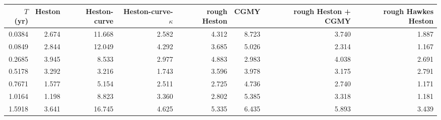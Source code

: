 \begin{tabular}{rrrrrrrr}
\toprule
$T$ (yr) & Heston & Heston-curve & Heston-curve-$\kappa$ & rough Heston & CGMY & rough Heston + CGMY & rough Hawkes Heston\\
\midrule
0.0384 & 2.674 & 11.668 & 2.582 & 4.312 & 8.723 & 3.740 & 1.887\\
0.0849 & 2.844 & 12.049 & 4.292 & 3.685 & 5.026 & 2.314 & 1.167\\
0.2685 & 3.945 & 8.533 & 2.977 & 4.883 & 2.983 & 4.038 & 2.691\\
0.5178 & 3.292 & 3.216 & 1.743 & 3.596 & 3.978 & 3.175 & 2.791\\
0.7671 & 1.577 & 5.154 & 2.511 & 2.725 & 4.736 & 2.740 & 1.171\\
1.0164 & 1.198 & 8.823 & 3.360 & 2.802 & 5.385 & 3.318 & 1.181\\
1.5918 & 3.641 & 16.745 & 4.625 & 5.335 & 6.435 & 5.893 & 3.439\\
\bottomrule
\end{tabular}
